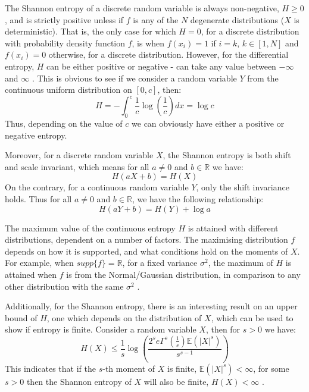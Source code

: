 \documentclass[12pt]{report}
\begin{document}
The Shannon entropy of a discrete random variable is always non-negative, $H \geq 0$, and is strictly positive unless if $f$ is any of the $N$ degenerate distributions ($X$ is deterministic). That is, the only case for which $H=0$, for a discrete distribution with probability density function $f$, is when $f(x_{i}) = 1$ if $i = k$, $k \in [1, N]$ and $f(x_{i}) = 0$ otherwise, for a discrete distribution. However, for the differential entropy, $H$ can be either positive or negative - can take any value between $-\infty$ and $\infty$ \cite{book2}. This is obvious to see if we consider a random variable $Y$ from the continuous uniform distribution on $[0, c]$, then:
\begin{equation}
H = - \int_{0}^{c} \frac{1}{c} \log \left( \frac{1}{c} \right) dx = \log c \nonumber
\end{equation}
Thus, depending on the value of $c$ we can obviously have either a positive or negative entropy.

Moreover, for a discrete random variable $X$, the Shannon entropy is both shift and scale invariant, which means for all $a \neq 0$ and $b \in \mathbb{R}$ we have:
\begin{equation}
H(aX + b) = H(X)
\end{equation}
On the contrary, for a continuous random variable $Y$, only the shift invariance holds. Thus for all $a \neq 0$ and $b \in \mathbb{R}$, we have the following relationship:
\begin{equation}
H(aY + b) = H(Y) + \log a
\end{equation}

The maximum value of the continuous entropy $H$ is attained with different distributions, dependent on a number of factors. The maximising distribution $f$ depends on how it is supported, and what conditions hold on the moments of $X$. For example, when $supp\{f\} = \mathbb{R}$, for a fixed variance $\sigma^2$, the maximum of $H$ is attained when $f$ is from the Normal/Gaussian distribution, in comparison to any other distribution with the same $\sigma^2$ \cite{paper8}.

Additionally, for the Shannon entropy, there is an interesting result on an upper bound of $H$, one which depends on the distribution of $X$, which can be used to show if entropy is finite. Consider a random variable $X$, then for $s > 0$ we have:
\begin{equation}
H(X) \leq \frac{1}{s} \log \left( \frac{2^s e \Gamma^s (\frac{1}{s}) \mathbb{E}(|X|^s)}{s^{s-1}}  \right)
\end{equation}
This indicates that if the $s$-th moment of $X$ is finite, $ \mathbb{E}(|X|^s) < \infty$, for some $s > 0$ then the Shannon entropy of $X$ will also be finite, $H(X) < \infty$ \cite{book3}.
\end{document}
